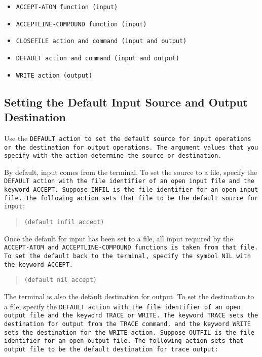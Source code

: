 \begin{itemize}
\item \tt{ACCEPT-ATOM} function (input)
\item \tt{ACCEPTLINE-COMPOUND} function (input)
\item \tt{CLOSEFILE} action and command (input and output)
\item \tt{DEFAULT} action and command (input and output)
\item \tt{WRITE} action (output)
\end{itemize}

\subsection{Setting the Default Input Source and Output Destination}

Use the \tt{DEFAULT} action to set the default source for input
operations or the destination for output operations. The argument
values that you specify with the action determine the source or
destination.

By default, input comes from the terminal. To set the source to a
file, specify the \tt{DEFAULT} action with the file identifier of an
open input file and the keyword \tt{ACCEPT}. Suppose \tt{INFIL} is the
file identifier for an open input file. The following action sets that
file to be the default source for input:

\begin{quote}
\begin{verbatim}
(default infil accept)
\end{verbatim}
\end{quote}

Once the default for input has been set to a file, all input required
by the \tt{ACCEPT-ATOM} and \tt{ACCEPTLINE-COMPOUND} functions is
taken from that file. To set the default back to the terminal, specify
the symbol \tt{NIL} with the keyword \tt{ACCEPT}.

\begin{quote}
\begin{verbatim}
(default nil accept)
\end{verbatim}
\end{quote}

The terminal is also the default destination for output. To set the
destination to a file, specify the \tt{DEFAULT} action with the file
identifier of an open output file and the keyword \tt{TRACE} or
\tt{WRITE}. The keyword \tt{TRACE} sets the destination for output
from the \tt{TRACE} command, and the keyword \tt{WRITE} sets the
destination for the \tt{WRITE} action. Suppose \tt{OUTFIL} is the file
identifier for an open output file. The following action sets that
output file to be the default destination for trace output:


